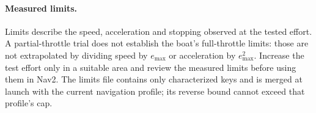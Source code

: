 \paragraph{Measured limits.} Limits describe the speed, acceleration and stopping
observed at the tested effort. A partial-throttle trial does not establish the
boat's full-throttle limits: those are not extrapolated by dividing speed by
$e_{\max}$ or acceleration by $e_{\max}^2$. Increase the test effort only in a
suitable area and review the measured limits before using them in Nav2. The
limits file contains only characterized keys and is merged at launch with the
current navigation profile; its reverse bound cannot exceed that profile's cap.




